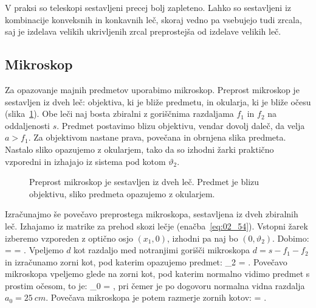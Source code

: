 V praksi so teleskopi sestavljeni precej bolj zapleteno. Lahko so sestavljeni iz kombinacije
konveksnih in konkavnih leč, skoraj vedno pa vsebujejo tudi zrcala, saj je izdelava
velikih ukrivljenih zrcal preprostejša od izdelave velikih leč. 

\subsection*{Mikroskop}
Za opazovanje majnih predmetov uporabimo mikroskop. Preprost mikroskop je sestavljen
iz dveh leč: objektiva, ki je bliže predmetu, in okularja, ki je bliže očesu 
(slika~\ref{fig:02_mikroskop}). Obe leči 
naj bosta zbiralni z goriščnima razdaljama $f_1$ in $f_2$ na oddaljenosti $s$. Predmet
postavimo blizu objektivu, vendar dovolj daleč, da velja $a>f_1$. Za objektivom 
nastane prava, povečana in obrnjena slika predmeta. Nastalo sliko opazujemo z okularjem, 
tako da so izhodni žarki praktično vzporedni in izhajajo iz sistema pod kotom $\vartheta_2$.
\begin{figure}[ht]
\centering
\def\svgwidth{100truemm} 

\caption{Preprost mikroskop je sestavljen iz dveh leč. Predmet je blizu objektivu, sliko
predmeta opazujemo z okularjem.}
\label{fig:02_mikroskop}
\end{figure}

Izračunajmo še povečavo preprostega mikroskopa, sestavljena iz dveh zbiralnih leč. Izhajamo
iz matrike za prehod skozi lečje (enačba~\ref{eq:02_54}). Vstopni žarek izberemo vzporeden
z optično osjo $(x_1, 0)$, izhodni pa naj bo $(0, \vartheta_2)$. Dobimo:
\beq
{} = 
\cdot
\left[\begin{array}{c}
x_1\\
0
\end{array}\right]  = 
\!\!.
\label{eq:02_67}
\eeq
Vpeljemo $d$ kot razdaljo med notranjimi gorišči mikroskopa
$d= s -f_1-f_2$ in izračunamo zorni kot, pod katerim opazujemo predmet:
\beq
\vartheta_2 = .
\label{eq:02_69}
\eeq
Povečavo mikroskopa vpeljemo glede na zorni kot, pod katerim 
normalno vidimo predmet s prostim očesom, to je:
\beq
\vartheta_0 = ,
\label{eq:02_70}
\eeq
pri čemer je po dogovoru normalna vidna razdalja $a_0 = 25~\si{cm}$.
Povečava mikroskopa je potem razmerje zornih kotov:
\beq
{} = .
\eeq

